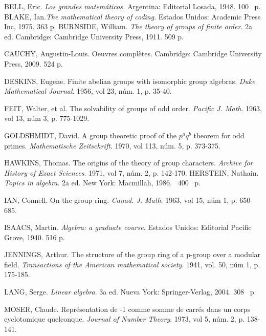 \begin{thebibliography}{99}
     BELL, Eric. \textit{Los grandes matemáticos.} Argentina: Editorial Losada, 1948. 100~ p. 
     BLAKE, Ian.\textit{The mathematical theory of coding}. Estados Unidos: Academic Press Inc, 1975. 363 p.
     BURNSIDE, William. \textit{The theory of groups of finite order}. 	2a ed. Cambridge: Cambridge University Press, 1911. 509 p.
        
    
      CAUCHY, Augustin-Louis. Oeuvres complètes. Cambridge: Cambridge University Press, 2009. 524 p.
     
      DESKINS, Eugene. Finite abelian groups with isomorphic group algebras. \textit{Duke Mathematical Journal}. 1956, vol 23, núm. 1, p. 35-40.
     
       FEIT, Walter, et al. The solvability of groups of odd order. \textit{Pacific J. Math}. 1963, vol 13, núm 3, p. 775-1029.
      
      GOLDSHMIDT, David. A group theoretic proof of the $p^aq^b$ theorem for odd primes. \textit{Mathematische Zeitschrift}. 1970, vol 113, núm. 5, p. 373-375.
    
      HAWKINS, Thomas. The origins of the theory of group characters. \textit{Archive for History of Exact Sciences}. 1971, vol 7, núm. 2, p. 142-170.
     HERSTEIN, Nathain. \textit{Topics in algebra}. 2a ed.  New York: Macmillah, 1986.~ 400~ p. 
    
 	 IAN, Connell. On the group ring. \textit{Canad. J. Math}. 1963, vol 15, núm 1, p. 650-685.
 	
   ISAACS, Martin. \textit{Algebra: a graduate course}. Estados Unidos: Editorial Pacific Grove, 1940. 516 p.  
   
    JENNINGS, Arthur. The structure of the group ring of a p-group over a modular field. \textit{Transactions of the American mathematical society}. 1941, vol. 50, núm 1, p. 175-185.
   
   
    LANG, Serge. \textit{Linear algebra}. 3a ed. Nueva York: Springer-Verlag, 2004. 308~ p.
    
     MOSER, Claude. Représentation de -1 comme somme de carrés dans un corps cyclotomique quelconque. \textit{Journal of Number Theory}. 1973, vol 5, núm. 2, p. 138-141.
    

\end{thebibliography}
